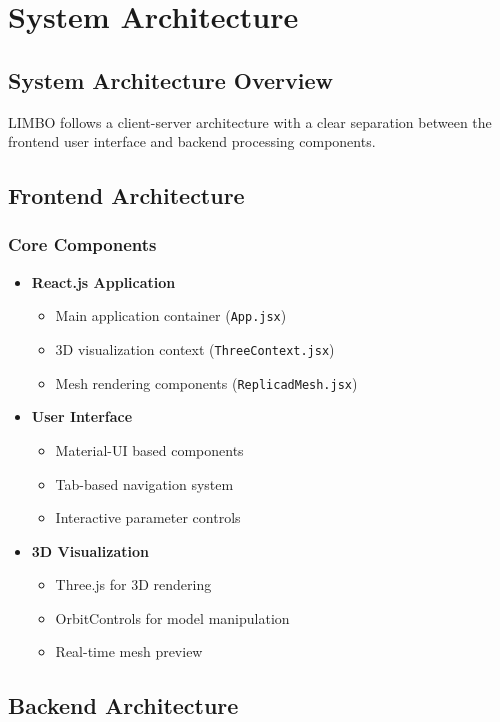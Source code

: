\chapter{System Architecture}

\section{System Architecture Overview}
LIMBO follows a client-server architecture with a clear separation between the frontend user interface and backend processing components.

\section{Frontend Architecture}
\subsection{Core Components}
\begin{itemize}
    \item \textbf{React.js Application}
        \begin{itemize}
            \item Main application container (\texttt{App.jsx})
            \item 3D visualization context (\texttt{ThreeContext.jsx})
            \item Mesh rendering components (\texttt{ReplicadMesh.jsx})
        \end{itemize}
    \item \textbf{User Interface}
        \begin{itemize}
            \item Material-UI based components
            \item Tab-based navigation system
            \item Interactive parameter controls
        \end{itemize}
    \item \textbf{3D Visualization}
        \begin{itemize}
            \item Three.js for 3D rendering
            \item OrbitControls for model manipulation
            \item Real-time mesh preview
        \end{itemize}
\end{itemize}

\section{Backend Architecture}
